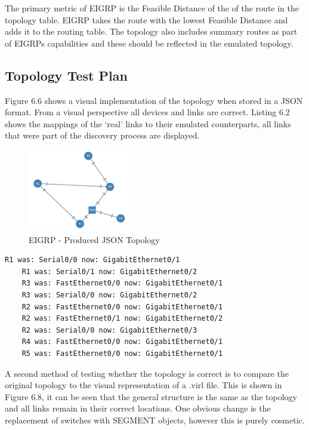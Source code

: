 \documentclass[11pt]{report}
\begin{document}
The primary metric of EIGRP is the Feasible Distance of the of the route in the topology table. EIGRP takes the route with the lowest Feasible Distance and adds it to the routing table. The topology also includes summary routes as part of EIGRPs capabilities and these should be reflected in the emulated topology.

\subsection{Topology Test Plan}

 Figure 6.6 shows a visual implementation of the topology when stored in a JSON format. From a visual perspective all devices and links are correct. Listing 6.2 shows the mappings of the `real' links to their emulated counterparts, all links that were part of the discovery process are displayed.

\FloatBarrier
\begin{figure}[h!]
	\caption{EIGRP - Produced JSON Topology}
	\centering
	\begin{center}
		\includegraphics[width=0.4\textwidth]{EIGRP-Web.png}
	\end{center}
\end{figure}
\FloatBarrier

\begin{lstlisting}[caption=Interface mappings for EIGRP topology]
	R1 was: Serial0/0 now: GigabitEthernet0/1
	R1 was: Serial0/1 now: GigabitEthernet0/2
	R3 was: FastEthernet0/0 now: GigabitEthernet0/1
	R3 was: Serial0/0 now: GigabitEthernet0/2
	R2 was: FastEthernet0/0 now: GigabitEthernet0/1
	R2 was: FastEthernet0/1 now: GigabitEthernet0/2
	R2 was: Serial0/0 now: GigabitEthernet0/3
	R4 was: FastEthernet0/0 now: GigabitEthernet0/1
	R5 was: FastEthernet0/0 now: GigabitEthernet0/1
\end{lstlisting}

A second method of testing whether the topology is correct is to compare the original topology to the visual representation of a .virl file. This is shown in Figure 6.8, it can be seen that the general structure is the same as the topology and all links remain in their correct locations. One obvious change is the replacement of switches with SEGMENT objects, however this is purely cosmetic.
\end{document}
